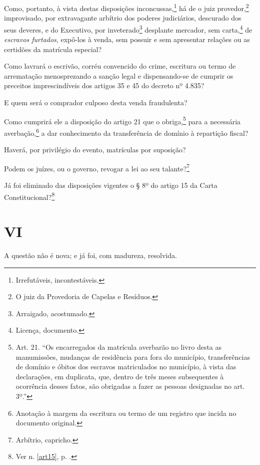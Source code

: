 Como, portanto, à vista destas disposições inconcussas,\footnote{
  Irrefutáveis, incontestáveis.} há de o juiz provedor,\footnote{O
  juiz da Provedoria de Capelas e Resíduos.} improvisado, por
extravagante arbítrio dos poderes judiciários, descurado dos seus
deveres, e do Executivo, por inveterado\footnote{Arraigado,
  acostumado.} desplante mercador, sem carta,\footnote{Licença,
  documento.} de \emph{escravos furtados}, expô-los à venda, sem
possuir e sem apresentar relações ou as certidões da matrícula especial?

Como lavrará o escrivão, corréu convencido do crime, escritura ou termo
de arrematação menosprezando a sanção legal e dispensando-se de cumprir
os preceitos imprescindíveis dos artigos 35 e 45 do decreto nº 4.835?

E quem será o comprador culposo desta venda fraudulenta?

Como cumprirá ele a disposição do artigo 21 que o obriga,\footnote{
  Art. 21. ``Os encarregados da matrícula averbarão no livro desta as
  manumissões, mudanças de residência para fora do município,
  transferências de domínio e óbitos dos escravos matriculados no
  município, à vista das declarações, em duplicata, que, dentro de três
  meses subsequentes à ocorrência desses fatos, são obrigadas a fazer as
  pessoas designadas no art. 3º.''} para a necessária averbação,\footnote{
  Anotação à margem da escritura ou termo de um registro que incida no
  documento original.} a dar conhecimento da transferência de domínio à
repartição fiscal?

Haverá, por privilégio do evento, matrículas por suposição?

Podem os juízes, ou o governo, revogar a lei ao seu talante?\footnote{
  Arbítrio, capricho.}

Já foi eliminado das disposições vigentes o § 8º do artigo 15 da Carta
Constitucional?\footnote{Ver n. \ref{art15}, p. \pageref{art15}.}

\section*{VI}

A questão não é nova; e já foi, com madureza, resolvida.

